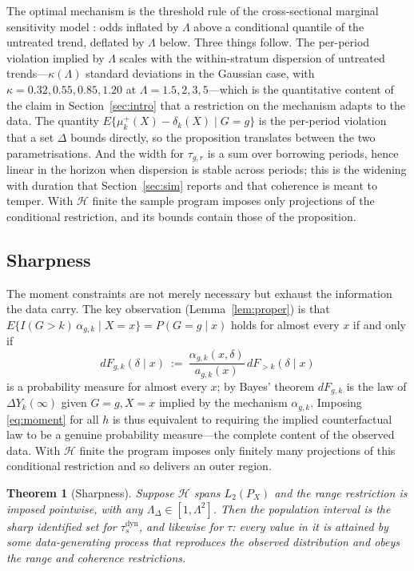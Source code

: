 \documentclass[12pt]{article}
\newtheorem{theorem}{Theorem}
\theoremstyle{remark}
\begin{document}
The optimal mechanism is the threshold rule of the cross-sectional marginal sensitivity
model \citep{tan2006distributional,dorn2023sharp}: odds inflated by $\Lambda$ above a
conditional quantile of the untreated trend, deflated by $\Lambda$ below. Three things
follow. The per-period violation implied by $\Lambda$ scales with the within-stratum
dispersion of untreated trends---$\kappa(\Lambda)$ standard deviations in the Gaussian
case, with $\kappa = 0.32, 0.55, 0.85, 1.20$ at $\Lambda = 1.5, 2, 3, 5$---which is the
quantitative content of the claim in Section~\ref{sec:intro} that a restriction on the
mechanism adapts to the data. The quantity $E\{\mu^{+}_k(X) - \delta_k(X) \mid G{=}g\}$
is the per-period violation that a \citet{rambachan2023honest} set $\Delta$ bounds
directly, so the proposition translates between the two parametrisations. And the width
for $\tau_{g,r}$ is a sum over borrowing periods, hence linear in the horizon when
dispersion is stable across periods; this is the widening with duration that
Section~\ref{sec:sim} reports and that coherence is meant to temper. With $\mathcal{H}$
finite the sample program imposes only projections of the conditional restriction, and its
bounds contain those of the proposition.

\subsection{Sharpness}
\label{sec:sharp}

The moment constraints are not merely necessary but exhaust the information the data carry.
The key observation (Lemma~\ref{lem:proper}) is that
$E\{I(G{>}k)\,\alpha_{g,k} \mid X{=}x\} = P(G{=}g \mid x)$ holds for almost every $x$ if
and only if
\[
dF_{g,k}(\delta \mid x) \ :=\ \frac{\alpha_{g,k}(x,\delta)}{a_{g,k}(x)}\,
dF_{>k}(\delta \mid x)
\]
is a probability measure for almost every $x$; by Bayes' theorem $dF_{g,k}$ is the law of
$\Delta Y_k(\infty)$ given $G = g, X = x$ implied by the mechanism $\alpha_{g,k}$. Imposing
\eqref{eq:moment} for all $h$ is thus equivalent to requiring the implied counterfactual
law to be a genuine probability measure---the complete content of the observed data. With
$\mathcal{H}$ finite the program imposes only finitely many projections of this
conditional restriction and so delivers an outer region.

\begin{theorem}[Sharpness]
\label{prop:sharp}
Suppose $\mathcal{H}$ spans $L_2(P_X)$ and the range restriction is imposed pointwise, with
any $\Lambda_\Delta \in [1, \Lambda^2]$. Then the population interval is the sharp
identified set for $\tau^{\mathrm{dyn}}_s$, and
likewise for $\tau$: every value in it is attained by some data-generating process that
reproduces the observed distribution and obeys the range and coherence restrictions.
\end{theorem}
\end{document}

